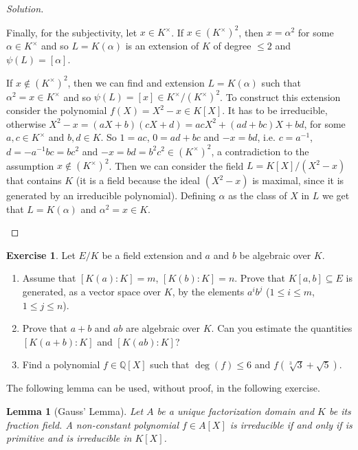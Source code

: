 \documentclass[a4paper,10pt,reqno]{amsart}
\newcommand{\Q}{\mathbb{Q}}
\newtheorem*{lem*}{Lemma}
\theoremstyle{definition} %
\newtheorem{ex}{Exercise}[section]
\newenvironment{sol}
  {\renewcommand\qedsymbol{$\blacksquare$}\begin{proof}[Solution]}
  {\end{proof}}
\begin{document}
\begin{sol}
\begin{enumerate}[label=(\roman*)]
        Finally, for the subjectivity, let $x\in K^\times$.
        If $x\in (K^\times)^2$, then $x=\alpha^2$ for some $\alpha\in K^\times$
        and so $L=K(\alpha)$ is an extension of $K$ of degree $\leq 2$ 
        and $\psi(L)=[\alpha]$.

        If $x\not\in (K^\times)^2$, then we can find and extension $L=K(\alpha)$ such that
        $\alpha^2=x\in K^\times$ and so $\psi(L)=[x]\in K^\times/(K^\times)^2$.
        To construct this extension consider the polynomial $f(X)=X^2-x\in K[X]$.
        It has to be irreducible, otherwise $X^2-x=(aX+b)(cX+d)=acX^2+(ad+bc)X+bd$, for some
        $a,c\in K^\times$ and $b,d\in K$.
        So $1=ac$, $0=ad+bc$ and $-x=bd$, i.e. $c=a^{-1}$, $d=-a^{-1}bc=bc^2$ and $-x=bd=b^2c^2\in (K^\times)^2$, a contradiction to the assumption $x\not\in (K^\times)^2$.
        Then we can consider the field $L=K[X]/(X^2-x)$ that contains $K$
        (it is a field because the ideal $(X^2-x)$ is maximal,
        since it is generated by an irreducible polynomial).
        Defining $\alpha$ as the class of $X$ in $L$ 
        we get that $L=K(\alpha)$ and $\alpha^2=x\in K$.        
    \end{enumerate}    
\end{sol}

\begin{ex}
    Let $E/K$ be a field extension and 
    $a$ and $b$ be algebraic over $K$.

    \begin{enumerate}
        \item Assume that $[K(a):K] = m$, $[K(b):K] = n$. Prove that $K[a,b] \subseteq E$ is generated, as a vector space over $K$, by the elements $a^ib^j$ ($1 \leq i \leq m$, $1 \leq j \leq n$).
        \item Prove that $a+b$ and $ab$ are algebraic over $K$. Can you estimate the quantities $[K(a+b):K]$ and $[K(ab):K]$?
        \item Find a polynomial $f \in \Q[X]$ such that $\deg(f) \leq 6$ and $f(\sqrt[3]{3} + \sqrt{5})$.
    \end{enumerate}
\end{ex}

The following lemma can be used, without proof, in the following exercise.

\begin{lem*}[Gauss' Lemma]
    Let $A$ be a unique factorization domain and $K$ be its fraction field.
    A non-constant polynomial $f\in A[X]$ is irreducible if and only if is primitive and is irreducible in $K[X]$.
\end{lem*}
\end{document}
